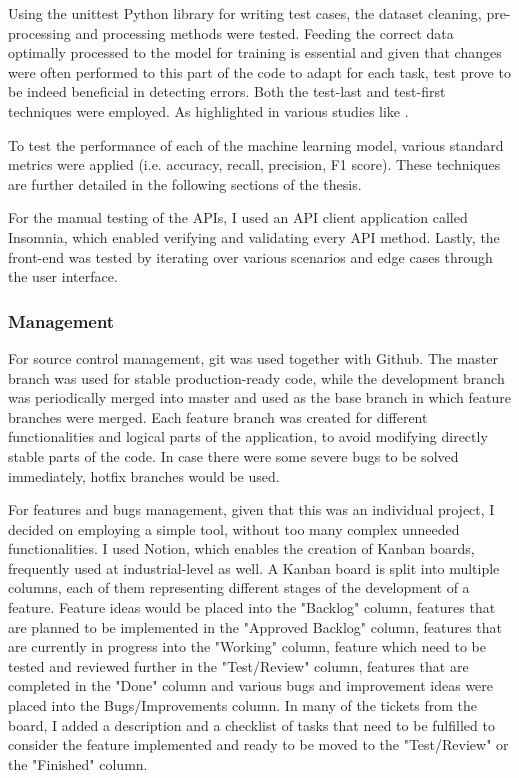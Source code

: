   Using the unittest Python library for writing test cases, the dataset cleaning, pre-processing and processing methods were tested. Feeding the correct data optimally processed to the model for training is essential and given that changes were often performed to this part of the code to adapt for each task, test prove to be indeed beneficial in detecting errors. Both the test-last and test-first techniques were employed. As highlighted in various studies like \cite{a9}.

  To test the performance of each of the machine learning model, various standard metrics were applied (i.e. accuracy, recall, precision, F1 score).  These techniques are further detailed in the following sections of the thesis.

  For the manual testing of the APIs, I used an API client application called Insomnia, which enabled verifying and validating every API method. Lastly, the front-end was tested by iterating over various scenarios and edge cases through the user interface.

\subsubsection{Management}

For source control management, git was used together with Github. The master branch was used for stable production-ready code, while the development branch was periodically merged into master and used as the base branch in which feature branches were merged. Each feature branch was created for different functionalities and logical parts of the application, to avoid modifying directly stable parts of the code. In case there were some severe bugs to be solved immediately, hotfix branches would be used.

For features and bugs management, given that this was an individual project, I decided on employing a simple tool, without too many complex unneeded functionalities. I used Notion, which enables the creation of Kanban boards, frequently used at industrial-level as well. A Kanban board is split into multiple columns, each of them representing different stages of the development of a feature. Feature ideas would be placed into the "Backlog" column, features that are planned to be implemented in the "Approved Backlog" column, features that are currently in progress into the "Working" column, feature which need to be tested and reviewed further in the "Test/Review" column, features that are completed in the "Done" column and various bugs and improvement ideas were placed into the Bugs/Improvements column. In many of the tickets from the board, I added a description and a checklist of tasks that need to be fulfilled to consider the feature implemented and ready to be moved to the "Test/Review" or the "Finished" column.


